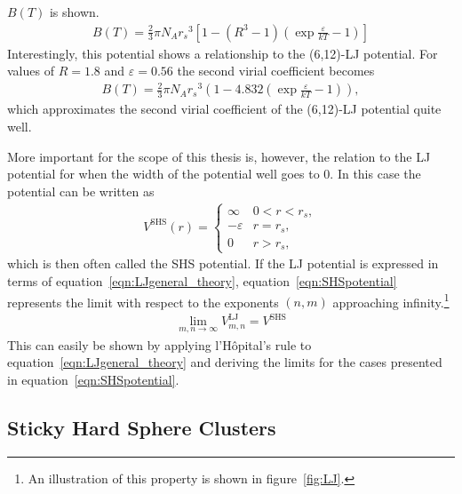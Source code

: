 $B(T)$ is shown.
%
\begin{align}
    B(T)=\frac{2}{3}\pi N_A{r_s}^3\left[1-(R^3-1)\left(\exp{\frac{\varepsilon}{kT}}-1\right)\right]
\end{align}
%
Interestingly, this potential shows a relationship to the (6,12)-\ac{LJ}
potential. For values of $R=1.8$ and $\varepsilon = 0.56$ the second virial
coefficient becomes
%
\begin{align}
    B(T)=\frac{2}{3}\pi N_A{r_s}^3\left(1-4.832\left(\exp{\frac{\varepsilon}{kT}}-1\right)\right),
\end{align}
%
which approximates the second virial coefficient of the (6,12)-\ac{LJ} potential
quite well.\autocite{Hirschfelder_Moleculartheorygases_1964}

More important for the scope of this thesis is, however, the relation to the
\ac{LJ} potential for when the width of the potential well goes to 0. In this
case the potential can be written as
%
\begin{align}
    V^\text{SHS}(r) =
    \begin{cases}
        \infty & 0 < r < r_s,\\
        -\varepsilon & r=r_s,\\
        0 & r > r_s,
    \end{cases}\label{eqn:SHSpotential}
\end{align}
%
which is then often called the \ac{SHS} potential. If the \ac{LJ} potential is
expressed in terms of equation~\eqref{eqn:LJgeneral_theory},
equation~\eqref{eqn:SHSpotential} represents the limit with respect to the
exponents $(n,m)$ approaching infinity.\footnote{An illustration of this
property is shown in figure~\ref{fig:LJ}.}
%
\begin{align}
    \lim_{m,n\to\infty} V_{m,n}^\text{LJ} = V^\text{SHS}
\end{align}
%
This can easily be shown by applying l'H\^opital's rule to
equation~\eqref{eqn:LJgeneral_theory} and deriving the limits for the cases
presented in equation~\eqref{eqn:SHSpotential}.

\subsection{Sticky Hard Sphere Clusters}
\label{sec:SHSClusters}

